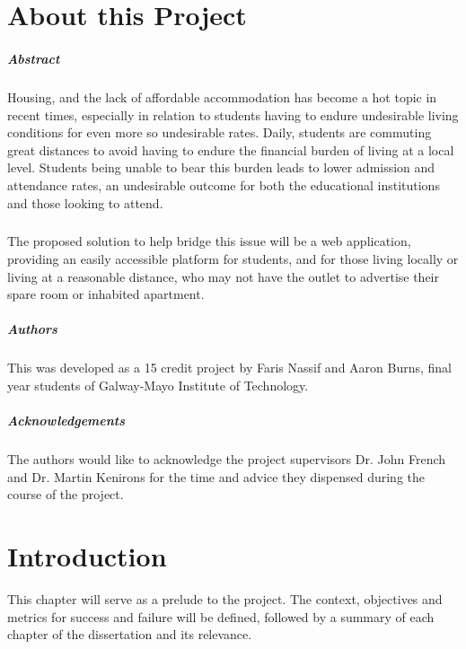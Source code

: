 \chapter*{About this Project}
\paragraph{Abstract}
Housing, and the lack of affordable accommodation has become a hot topic in recent times, especially in relation to students having to endure undesirable living conditions for even more so undesirable rates. Daily, students are commuting great distances to avoid having to endure the financial burden of living at a local level. Students being unable to bear this burden leads to lower admission and attendance rates, an undesirable outcome for both the educational institutions and those looking to attend.

\paragraph{}
The proposed solution to help bridge this issue will be a web application, providing an easily accessible platform for students, and for those living locally or living at a reasonable distance, who may not have the outlet to advertise their spare room or inhabited apartment. 

\paragraph{Authors}
This was developed as a 15 credit project by Faris Nassif and Aaron Burns, final year students of Galway-Mayo Institute of Technology.

\paragraph{Acknowledgements}
The authors would like to acknowledge the project supervisors Dr. John French and Dr. Martin Kenirons for the time and advice they dispensed during the course of the project.

\chapter{Introduction}
This chapter will serve as a prelude to the project. The context, objectives and metrics for success and failure will be defined, followed by a summary of each chapter of the dissertation and its relevance.

